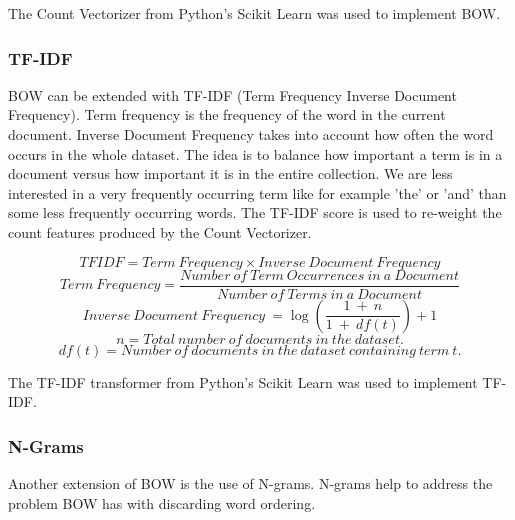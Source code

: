 The Count Vectorizer from Python's Scikit Learn was used to implement BOW. 

\subsubsection{TF-IDF}

BOW can be extended with TF-IDF (Term Frequency Inverse Document Frequency). Term frequency is the frequency of the word in the current document. Inverse Document Frequency takes into account how often the word occurs in the whole dataset. The idea is to balance how important a term is in a document versus how important it is in the entire collection. We are less interested in a very frequently occurring term like for example 'the' or 'and' than some less frequently occurring words. The TF-IDF score is used to re-weight the count features produced by the Count Vectorizer.

\begin{tcolorbox}[title=TF-IDF]
\begin{equation}
    TFIDF = Term\ Frequency \times Inverse\ Document\ Frequency 
\end{equation}
\newline
\begin{equation}
    Term\ Frequency = \frac{Number\ of\ Term\ Occurrences\ in\ a\ Document}{Number\ of\ Terms\ in\ a\ Document}
\end{equation}
\newline
\begin{equation}
    Inverse\ Document\ Frequency\ = \log (\frac{1\ +\ n}{1\ +\ df(t)}) + 1 
\end{equation}
\newline
\begin{equation}
    n = Total\ number\ of\ documents\ in\ the\ dataset. 
\end{equation}
\newline
\begin{equation}
    df(t) = Number\ of\ documents\ in\ the\ dataset\ containing\ term\ t.
\end{equation}
\end{tcolorbox}
The TF-IDF transformer from Python's Scikit Learn was used to implement TF-IDF.

\subsubsection*{N-Grams}

Another extension of BOW is the use of N-grams. N-grams help to address the problem BOW has with discarding word ordering.

